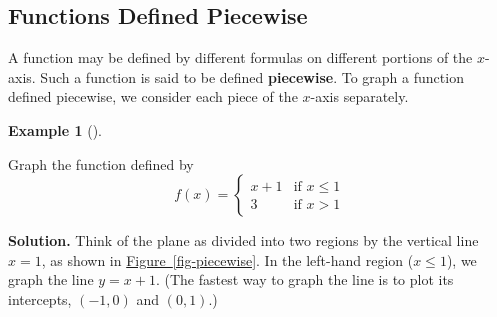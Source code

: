 \documentclass[10pt,]{book}
\newcommand{\terminology}[1]{\textbf{#1}}
\theoremstyle{plain}
\theoremstyle{definition}
\theoremstyle{definition}
\theoremstyle{definition}
\newtheorem{example}[theorem]{Example}
\theoremstyle{definition}
\theoremstyle{definition}
\numberwithin{equation}{section}
\newcounter{figstack}
\newlength\fight
\newcommand\pushValignCaptionBottom[5][b]{%
\stepcounter{figstack}%
\expandafter\def\csname %
figalign\romannumeral\value{figstack}\endcsname{#1}%
\expandafter\def\csname %
figtype\romannumeral\value{figstack}\endcsname{#2}%
\expandafter\def\csname %
figwd\romannumeral\value{figstack}\endcsname{#3}%
\expandafter\def\csname %
figcontent\romannumeral\value{figstack}\endcsname{#4}%
\expandafter\def\csname %
figcap\romannumeral\value{figstack}\endcsname{#5}%
\setbox0=\hbox{%
\begin{#2}{#3}#4\end{#2}}%
\ifdim\dimexpr\ht0+\dp0\relax>\fight\global\setlength{\fight}{%
\dimexpr\ht0+\dp0\relax}\fi%
}
\newcommand{\gt}{ > }
\newcommand{\amp}{ & }
\begin{document}
\subsection[Functions Defined Piecewise]{Functions Defined Piecewise}\label{subsection-41}

        A function may be defined by different formulas on different portions of the \(x\)-axis. Such a function is said to be defined \terminology{piecewise}. To graph a function defined piecewise, we consider each piece of the \(x\)-axis separately.
\begin{example}[]\label{example-piecewise}

        Graph the function defined by   
        \begin{equation*}
            f(x) =
            \begin{cases}
            x +1  \amp \text{if } x\le 1\\
            3  \amp \text{if } x\gt 1
            \end{cases}
        \end{equation*}
\par\medskip\noindent%
\textbf{Solution.}\quad 
        Think of the plane as divided into two regions by the vertical line \(x = 1\), as shown in \hyperref[fig-piecewise]{Figure~\ref{fig-piecewise}}. In the left-hand region (\(x \le 1\)), we graph the line \(y = x + 1\). (The fastest way to graph the line is to plot its intercepts, \((−1, 0)\) and \((0, 1)\).) 
\leavevmode%
\end{example}
\end{document}
